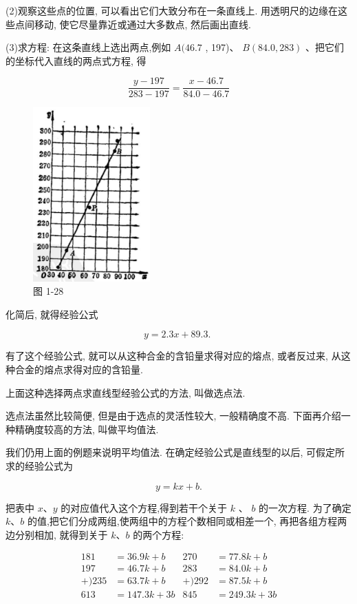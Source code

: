\documentclass[lang=cn,newtx,10pt,scheme=chinese]{elegantbook}
\begin{document}
(2)观察这些点的位置, 可以看出它们大致分布在一条直线上. 用透明尺的边缘在这些点间移动, 使它尽量靠近或通过大多数点, 然后画出直线.

(3)求方程: 在这条直线上选出两点,例如 \(A({46.7}\) , 197)、 \(B\left( {{84.0},{283}}\right)\) 、把它们的坐标代入直线的两点式方程, 得

\[
  \frac{y - {197}}{{283} - {197}} = \frac{x - {46.7}}{{84.0} - {46.7}}
\]

\begin{figure}[h]
  \centering
  \includegraphics[max width=0.4\textwidth]{images/01912cc2-ffb6-728e-9ae7-b113ff05c64b_37_976668.jpg}
  \caption{图 1-28}
\end{figure}



化简后, 就得经验公式

\[
  y = {2.3x} + {89.3}\text{. }
\]

有了这个经验公式, 就可以从这种合金的含铅量求得对应的熔点, 或者反过来, 从这种合金的熔点求得对应的含铅量.

上面这种选择两点求直线型经验公式的方法, 叫做选点法.

选点法虽然比较简便, 但是由于选点的灵活性较大, 一般精确度不高. 下面再介绍一种精确度较高的方法, 叫做平均值法.

我们仍用上面的例题来说明平均值法. 在确定经验公式是直线型的以后, 可假定所求的经验公式为

\[
  y = {kx} + b.
\]

把表中 \(x\text{、}y\) 的对应值代入这个方程,得到若干个关于 \(k\) 、 \(b\) 的一次方程. 为了确定 \(k\text{、}b\) 的值,把它们分成两组,使两组中的方程个数相同或相差一个, 再把各组方程两边分别相加, 就得到关于 \(k\text{、}b\) 的两个方程:

\[
  \begin{aligned} {181} & = {36.9k} + b & {270} & = {77.8k} + b \\ {197} & = {46.7k} + b & {283} & = {84.0k} + b \\ + ){235} & = {63.7k} + b & + ){292} & = {87.5k} + b \\ {613} & = {147.3k} + {3b} & {845} & = {249.3k} + {3b} \end{aligned}
\]
\end{document}
